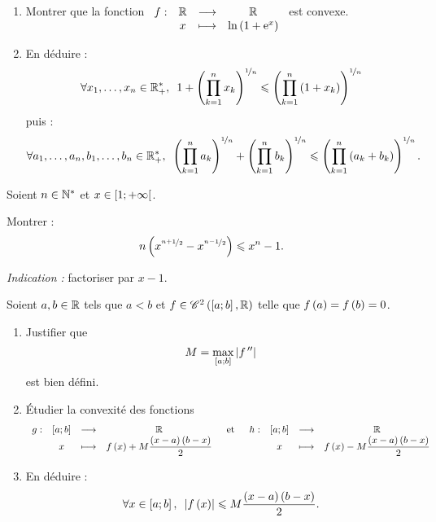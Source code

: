 \begin{exo}
\begin{enumerate}
\item Montrer que la fonction \(\begin{array}[t]{cccc}f : & \mathbb{R} & \longrightarrow & \mathbb{R} \\ & x & \longmapsto & \ln\left(1+\mathrm{e}^{x}\right)\end{array}\) est convexe. \\

\item En déduire : \[\quantifs{\forall x_1,\dots,x_n\in\Rps}1+\paren{\prod_{k=1}^nx_k}^{\nicefrac{1}{n}}\leq\paren{\prod_{k=1}^n\paren{1+x_k}}^{\nicefrac{1}{n}}\] puis : \[\quantifs{\forall a_1,\dots,a_n,b_1,\dots,b_n\in\Rps}\paren{\prod_{k=1}^na_k}^{\nicefrac{1}{n}}+\paren{\prod_{k=1}^nb_k}^{\nicefrac{1}{n}}\leq\paren{\prod_{k=1}^n\paren{a_k+b_k}}^{\nicefrac{1}{n}}.\]
\end{enumerate}
\end{exo}

\begin{corr}
\end{corr}

\begin{exo}
Soient \(n\in\mathbb{N}^*\) et \(x\in\left[1;+\infty\right[\).

Montrer : \[n\left(x^{\nicefrac{n+1}{2}}-x^{\nicefrac{n-1}{2}}\right)\leqslant x^n-1.\]

\textit{Indication :} factoriser par \(x-1\).
\end{exo}

\begin{corr}
\end{corr}

\begin{exo}
Soient \(a,b\in\mathbb{R}\) tels que \(a<b\) et \(f\in\mathscr{C}^{2}\left(\left[a;b\right],\mathbb{R}\right)\) telle que \(f\left(a\right)=f\left(b\right)=0\).

\begin{enumerate}
\item Justifier que \[M=\max_{\left[a;b\right]}\left\lvert f^{\,\prime\prime}\right\rvert\] est bien défini. \\

\item Étudier la convexité des fonctions \[\begin{array}[t]{cccc}g : & \left[a;b\right] & \longrightarrow & \mathbb{R} \\ & x & \longmapsto & f\left(x\right)+M\dfrac{\left(x-a\right)\left(b-x\right)}{2}\end{array}\quad\text{et}\quad\begin{array}[t]{cccc}h : & \left[a;b\right] & \longrightarrow & \mathbb{R} \\ & x & \longmapsto & f\left(x\right)-M\dfrac{\left(x-a\right)\left(b-x\right)}{2}\end{array}\]

\item En déduire : \[\quantifs{\forall x\in\intervii{a}{b}}\abs{f\paren{x}}\leq M\dfrac{\paren{x-a}\paren{b-x}}{2}.\]
\end{enumerate}
\end{exo}

